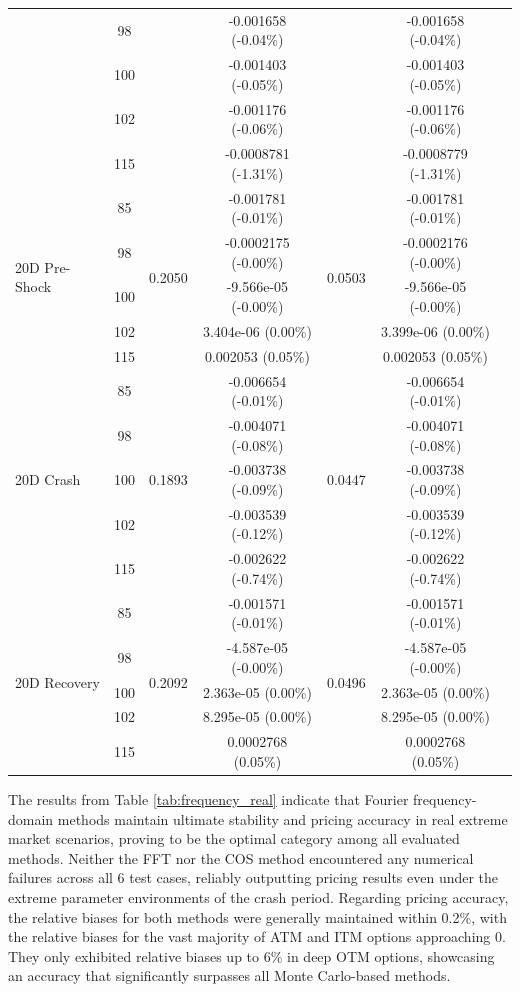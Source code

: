 \begin{table}[htbp]
{\begin{tabular}{lclcccc}
    & 98 & & -0.001658 (-0.04\%) & & -0.001658 (-0.04\%) \\
    & 100 & & -0.001403 (-0.05\%) & & -0.001403 (-0.05\%) \\
    & 102 & & -0.001176 (-0.06\%) & & -0.001176 (-0.06\%) \\
    & 115 & & -0.0008781 (-1.31\%) & & -0.0008779 (-1.31\%) \\
    \midrule
    \multirow{5}{*}{20D Pre-Shock} 
    & 85 & \multirow{5}{*}{0.2050} & -0.001781 (-0.01\%) & \multirow{5}{*}{0.0503} & -0.001781 (-0.01\%) \\
    & 98 & & -0.0002175 (-0.00\%) & & -0.0002176 (-0.00\%) \\
    & 100 & & -9.566e-05 (-0.00\%) & & -9.566e-05 (-0.00\%) \\
    & 102 & & 3.404e-06 (0.00\%) & & 3.399e-06 (0.00\%) \\
    & 115 & & 0.002053 (0.05\%) & & 0.002053 (0.05\%) \\
    \midrule
    \multirow{5}{*}{20D Crash} 
    & 85 & \multirow{5}{*}{0.1893} & -0.006654 (-0.01\%) & \multirow{5}{*}{0.0447} & -0.006654 (-0.01\%) \\
    & 98 & & -0.004071 (-0.08\%) & & -0.004071 (-0.08\%) \\
    & 100 & & -0.003738 (-0.09\%) & & -0.003738 (-0.09\%) \\
    & 102 & & -0.003539 (-0.12\%) & & -0.003539 (-0.12\%) \\
    & 115 & & -0.002622 (-0.74\%) & & -0.002622 (-0.74\%) \\
    \midrule
    \multirow{5}{*}{20D Recovery} 
    & 85 & \multirow{5}{*}{0.2092} & -0.001571 (-0.01\%) & \multirow{5}{*}{0.0496} & -0.001571 (-0.01\%) \\
    & 98 & & -4.587e-05 (-0.00\%) & & -4.587e-05 (-0.00\%) \\
    & 100 & & 2.363e-05 (0.00\%) & & 2.363e-05 (0.00\%) \\
    & 102 & & 8.295e-05 (0.00\%) & & 8.295e-05 (0.00\%) \\
    & 115 & & 0.0002768 (0.05\%) & & 0.0002768 (0.05\%) \\
    \bottomrule
  \end{tabular}%
  }
\end{table}

The results from Table \ref{tab:frequency_real} indicate that Fourier frequency-domain methods maintain ultimate stability and pricing accuracy in real extreme market scenarios, proving to be the optimal category among all evaluated methods. Neither the FFT nor the COS method encountered any numerical failures across all 6 test cases, reliably outputting pricing results even under the extreme parameter environments of the crash period. Regarding pricing accuracy, the relative biases for both methods were generally maintained within 0.2\%, with the relative biases for the vast majority of ATM and ITM options approaching 0. They only exhibited relative biases up to 6\% in deep OTM options, showcasing an accuracy that significantly surpasses all Monte Carlo-based methods.


